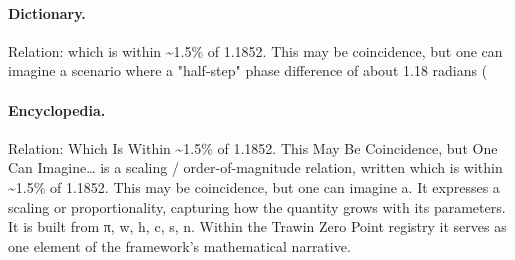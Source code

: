 \paragraph{Dictionary.}
Relation:  which is within \textasciitilde{}1.5\% of 1.1852. This may be coincidence, but one can imagine a scenario where a "half-step" phase difference of about 1.18 radians (

\paragraph{Encyclopedia.}
Relation: Which Is Within \textasciitilde{}1.5\% of 1.1852. This May Be Coincidence, but One Can Imagine… is a scaling / order-of-magnitude relation, written which is within \textasciitilde{}1.5\% of 1.1852. This may be coincidence, but one can imagine a. It expresses a scaling or proportionality, capturing how the quantity grows with its parameters. It is built from π, w, h, c, s, n. Within the Trawin Zero Point registry it serves as one element of the framework's mathematical narrative.
